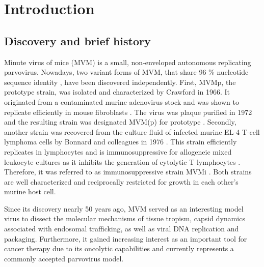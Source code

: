 
\chapter{Introduction} %

\label{Chapter1} %


\graphicspath{{./Pictures/}}

\section{Discovery and brief history}
\label{sec:Discovery and brief history}
Minute virus of mice (MVM) is a small, non-enveloped autonomous replicating parvovirus. Nowadays, two variant forms of MVM, that share 96 \% nucleotide sequence identity \cite{pmid3855242}, have been discovered independently. 
First, MVMp, the prototype strain, was isolated and characterized by Crawford in 1966. It originated from a contaminated murine adenovirus stock and was shown to replicate efficiently in mouse fibroblasts \cite{pmid5945715}. The virus was plaque purified in 1972 \cite{pmid4673484} and the resulting strain was designated MVM(p) for prototype \cite{MVMp}. Secondly, another strain was recovered from the culture fluid of infected murine EL-4 T-cell lymphoma cells by Bonnard and colleagues in 1976 \cite{pmid1244418}. This strain efficiently replicates in lymphocytes and is immunosuppressive for allogeneic mixed leukocyte cultures as it inhibits the generation of cytolytic T lymphocytes \cite{pmid6457871}. Therefore, it was referred to as immunosuppressive strain MVMi \cite{pmid6264106}. Both strains are well characterized and reciprocally restricted for growth in each other’s murine host cell.  

Since its discovery nearly 50 years ago, MVM served as an interesting model virus to dissect the molecular mechanisms of tissue tropism, capsid dynamics associated with endosomal trafficking, as well as viral DNA replication and packaging. Furthermore, it gained increasing interest as an important tool for cancer therapy due to its oncolytic capabilities and currently represents a commonly accepted parvovirus model.     


